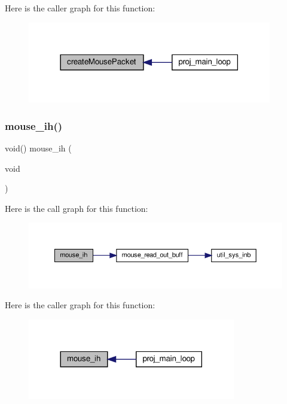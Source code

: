 Here is the caller graph for this function\+:\nopagebreak
\begin{figure}[H]
\begin{center}
\leavevmode
\includegraphics[width=302pt]{group__mouse_gabd35692be21807c9d3f1ae016fe7d6ec_icgraph}
\end{center}
\end{figure}
\mbox{\label{group__mouse_ga210374b50462acdedab00df64d5cea3c}} 
\subsubsection{\texorpdfstring{mouse\+\_\+ih()}{mouse\_ih()}}
{\footnotesize\ttfamily void() mouse\+\_\+ih (\begin{DoxyParamCaption}\item[{void}]{ }\end{DoxyParamCaption})}

Here is the call graph for this function\+:\nopagebreak
\begin{figure}[H]
\begin{center}
\leavevmode
\includegraphics[width=350pt]{group__mouse_ga210374b50462acdedab00df64d5cea3c_cgraph}
\end{center}
\end{figure}
Here is the caller graph for this function\+:\nopagebreak
\begin{figure}[H]
\begin{center}
\leavevmode
\includegraphics[width=257pt]{group__mouse_ga210374b50462acdedab00df64d5cea3c_icgraph}
\end{center}
\end{figure}
\mbox{\label{group__mouse_ga3f43ee9f00f28eb503b80a8589216e5f}} 

